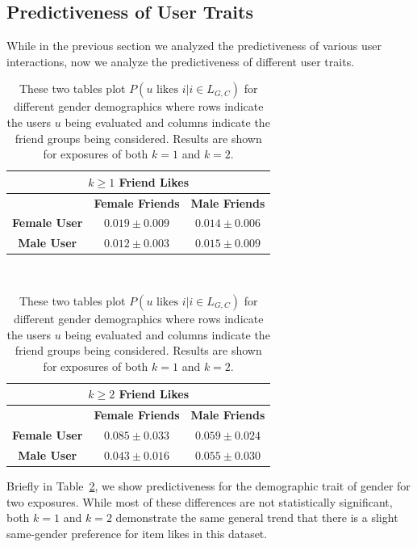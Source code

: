 \subsection{Predictiveness of User Traits}

\label{sec:interest_history}

While in the previous section we analyzed the predictiveness
of various user interactions, now we analyze the predictiveness
of different user traits.

\begin{table}[t!]
\centering
\begin{tabular}{|c|c|c|} 
\multicolumn{3}{c}{\textbf{$k \geq 1$ Friend Likes}} \\ \hline
& \textbf{Female Friends} & \textbf{Male Friends} \\ \hline
\textbf{Female User} & $0.019 \pm 0.009$ & $0.014 \pm 0.006$ \\ \hline
\textbf{Male User}   & $0.012 \pm 0.003$ & $0.015 \pm 0.009$ \\ \hline
\end{tabular} $\qquad$
\begin{tabular}{|c|c|c|} 
\multicolumn{3}{c}{\textbf{$k \geq 2$ Friend Likes}} \\ \hline
& \textbf{Female Friends} & \textbf{Male Friends} \\ \hline
\textbf{Female User} & $0.085 \pm 0.033$ & $0.059 \pm 0.024$ \\ \hline
\textbf{Male User}   & $0.043 \pm 0.016$ & $0.055 \pm 0.030$ \\ \hline
\end{tabular}
\caption{These two tables plot $P(u \mbox{ likes } i | i \in L_{G,C})$
for different gender demographics where rows indicate the
users $u$ being evaluated and columns indicate the friend groups
being considered.  Results are shown for exposures of both
$k=1$ and $k=2$.}
\label{fig:res6}
\end{table}

Briefly in Table~\ref{fig:res6}, we show predictiveness for
the demographic trait of gender for two exposures.  
While most of these differences are
not statistically significant, both $k=1$ and $k=2$ demonstrate
the same general trend that there is a slight same-gender
preference for item likes in this dataset.

